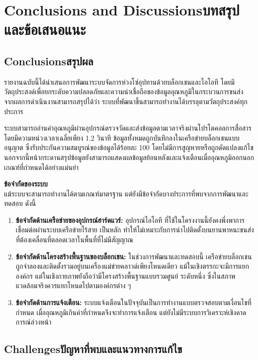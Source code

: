 \chapter{\ifenglish Conclusions and Discussions\else บทสรุปและข้อเสนอแนะ\fi}

\section{\ifenglish Conclusions\else สรุปผล\fi}

รายงานฉบับนี้ได้นำเสนอการพัฒนาระบบจัดการห่วงโซ่อุปทานด้วยบล็อกเชนและไอโอที โดยมีวัตถุประสงค์เพื่อยกระดับความปลอดภัยและความน่าเชื่อถือของข้อมูลอุณหภูมิในกระบวนการขนส่ง จากผลการดำเนินงานสามารถสรุปได้ว่า ระบบที่พัฒนาขึ้นสามารถทำงานได้บรรลุตามวัตถุประสงค์ทุกประการ 

ระบบสามารถอ่านค่าอุณหภูมิผ่านอุปกรณ์ตรวจวัดและส่งข้อมูลตามเวลาจริงผ่านโปรโตคอลการสื่อสาร โดยมีความหน่วงเวลาเฉลี่ยเพียง 1.2 วินาที ข้อมูลทั้งหมดถูกบันทึกลงในเครือข่ายบล็อกเชนแบบอนุญาต ซึ่งรับประกันความสมบูรณ์ของข้อมูลได้ร้อยละ 100 โดยไม่มีการสูญหายหรือถูกดัดแปลงแก้ไข นอกจากนี้หน้ากระดานสรุปข้อมูลยังสามารถแสดงผลข้อมูลย้อนหลังและแจ้งเตือนเมื่ออุณหภูมิออกนอกเกณฑ์ที่กำหนดได้อย่างแม่นยำ

\textbf{ข้อจำกัดของระบบ} \\
แม้ระบบจะสามารถทำงานได้ตามเกณฑ์มาตรฐาน แต่ยังมีข้อจำกัดบางประการที่พบจากการพัฒนาและทดสอบ ดังนี้
\begin{enumerate}
    \item \textbf{ข้อจำกัดด้านเครือข่ายของอุปกรณ์ฮาร์ดแวร์:} อุปกรณ์ไอโอที ที่ใช้ในโครงงานนี้ยังคงพึ่งพาการเชื่อมต่อผ่านระบบเครือข่ายไร้สาย เป็นหลัก ทำให้ไม่เหมาะกับการนำไปติดตั้งบนยานพาหนะขนส่งที่ต้องเคลื่อนที่ตลอดเวลาในพื้นที่ที่ไม่มีสัญญาณ
    \item \textbf{ข้อจำกัดด้านโครงสร้างพื้นฐานของบล็อกเชน:} ในช่วงการพัฒนาและทดสอบนี้ เครือข่ายบล็อกเชนถูกจำลองและติดตั้งรวมอยู่บนเครื่องแม่ข่ายคลาวด์เพียงโหนดเดียว แม้ในเชิงตรรกะจะมีการแยกองค์กร แต่ในเชิงกายภาพยังถือว่ามีโครงสร้างพื้นฐานแบบรวมศูนย์ ระดับหนึ่ง ซึ่งในสภาพแวดล้อมจริงควรแยกโหนดไปตามองค์กรต่าง ๆ
    \item \textbf{ข้อจำกัดด้านการแจ้งเตือน:} ระบบแจ้งเตือนในปัจจุบันเป็นการทำงานแบบตรวจสอบตามเงื่อนไขที่กำหนด เมื่ออุณหภูมิเกินค่าที่กำหนดจึงจะทำการแจ้งเตือน แต่ยังไม่มีระบบการวิเคราะห์เชิงคาดการณ์ล่วงหน้า
\end{enumerate}

\section{\ifenglish Challenges\else ปัญหาที่พบและแนวทางการแก้ไข\fi}

